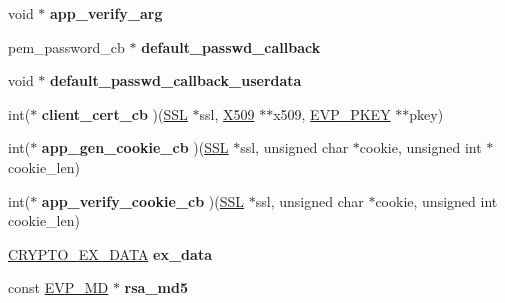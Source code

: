 \begin{DoxyCompactItemize}
\item 
\hypertarget{structssl__ctx__st_ac65736129c311f93009b7f3d67b95bcf}{}void $\ast$ {\bfseries app\+\_\+verify\+\_\+arg}\label{structssl__ctx__st_ac65736129c311f93009b7f3d67b95bcf}

\item 
\hypertarget{structssl__ctx__st_a8065ec3c28e4a61ff8041119cc029aa2}{}pem\+\_\+password\+\_\+cb $\ast$ {\bfseries default\+\_\+passwd\+\_\+callback}\label{structssl__ctx__st_a8065ec3c28e4a61ff8041119cc029aa2}

\item 
\hypertarget{structssl__ctx__st_a66ba3cb88f01250883fd336791b354b2}{}void $\ast$ {\bfseries default\+\_\+passwd\+\_\+callback\+\_\+userdata}\label{structssl__ctx__st_a66ba3cb88f01250883fd336791b354b2}

\item 
\hypertarget{structssl__ctx__st_a8e17061307de6d07b35e2563ef8ce550}{}int($\ast$ {\bfseries client\+\_\+cert\+\_\+cb} )(\hyperlink{structssl__st}{S\+S\+L} $\ast$ssl, \hyperlink{structx509__st}{X509} $\ast$$\ast$x509, \hyperlink{structevp__pkey__st}{E\+V\+P\+\_\+\+P\+K\+E\+Y} $\ast$$\ast$pkey)\label{structssl__ctx__st_a8e17061307de6d07b35e2563ef8ce550}

\item 
\hypertarget{structssl__ctx__st_ab2351134c9d3a5f42c85d731edfa4c1b}{}int($\ast$ {\bfseries app\+\_\+gen\+\_\+cookie\+\_\+cb} )(\hyperlink{structssl__st}{S\+S\+L} $\ast$ssl, unsigned char $\ast$cookie, unsigned int $\ast$cookie\+\_\+len)\label{structssl__ctx__st_ab2351134c9d3a5f42c85d731edfa4c1b}

\item 
\hypertarget{structssl__ctx__st_ae4800a3da47080713f12d4d1ca51be16}{}int($\ast$ {\bfseries app\+\_\+verify\+\_\+cookie\+\_\+cb} )(\hyperlink{structssl__st}{S\+S\+L} $\ast$ssl, unsigned char $\ast$cookie, unsigned int cookie\+\_\+len)\label{structssl__ctx__st_ae4800a3da47080713f12d4d1ca51be16}

\item 
\hypertarget{structssl__ctx__st_a5deb70881c01f2e35ea2fa46c37ba21e}{}\hyperlink{structcrypto__ex__data__st}{C\+R\+Y\+P\+T\+O\+\_\+\+E\+X\+\_\+\+D\+A\+T\+A} {\bfseries ex\+\_\+data}\label{structssl__ctx__st_a5deb70881c01f2e35ea2fa46c37ba21e}

\item 
\hypertarget{structssl__ctx__st_a297d3bf2019076959d84c41a41e7ac3b}{}const \hyperlink{structenv__md__st}{E\+V\+P\+\_\+\+M\+D} $\ast$ {\bfseries rsa\+\_\+md5}\label{structssl__ctx__st_a297d3bf2019076959d84c41a41e7ac3b}


\end{DoxyCompactItemize}
